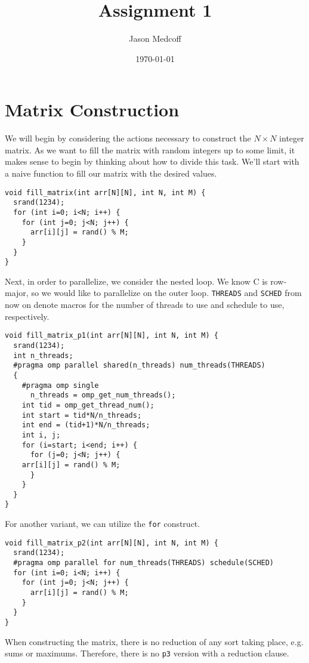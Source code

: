 \documentclass[11pt]{article}
\author{Jason Medcoff}
\date{\today}
\title{Assignment 1}
\begin{document}
\maketitle

\section{Matrix Construction}
\label{sec-1}

We will begin by considering the actions necessary to construct the $N
\times N$ integer matrix. As we want to fill the matrix with random
integers up to some limit, it makes sense to begin by thinking about
how to divide this task. We'll start with a naive function to fill our
matrix with the desired values.

\begin{verbatim}
void fill_matrix(int arr[N][N], int N, int M) {
  srand(1234);
  for (int i=0; i<N; i++) {
    for (int j=0; j<N; j++) {
      arr[i][j] = rand() % M;
    }
  }
}
\end{verbatim}

Next, in order to parallelize, we consider the nested loop. We know C
is row-major, so we would like to parallelize on the outer
loop. \verb~THREADS~ and \verb~SCHED~ from now on denote macros for the number
of threads to use and schedule to use, respectively.

\begin{verbatim}
void fill_matrix_p1(int arr[N][N], int N, int M) {
  srand(1234);
  int n_threads;
  #pragma omp parallel shared(n_threads) num_threads(THREADS)
  {
    #pragma omp single
      n_threads = omp_get_num_threads();
    int tid = omp_get_thread_num();
    int start = tid*N/n_threads;
    int end = (tid+1)*N/n_threads;
    int i, j;
    for (i=start; i<end; i++) {
      for (j=0; j<N; j++) {
	arr[i][j] = rand() % M;
      }
    }
  }
}
\end{verbatim}

For another variant, we can utilize the \verb~for~ construct.

\begin{verbatim}
void fill_matrix_p2(int arr[N][N], int N, int M) {
  srand(1234);
  #pragma omp parallel for num_threads(THREADS) schedule(SCHED)
  for (int i=0; i<N; i++) {
    for (int j=0; j<N; j++) {
      arr[i][j] = rand() % M;
    }
  }
}
\end{verbatim}

When constructing the matrix, there is no reduction of any sort taking
place, e.g. sums or maximums. Therefore, there is no \verb~p3~ version with
a reduction clause.
\end{document}
